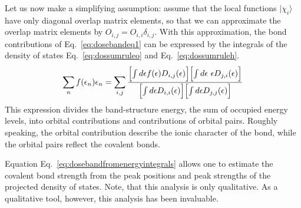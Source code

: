 \documentclass[final,12pt,makeidx,DIV=calc]{article}
\begin{document}
{{{{{{Let us now make a simplifying assumption: assume that the local
functions $|\chi_i\rangle$ have only diagonal overlap matrix elements,
so that we can approximate the overlap matrix elements by
$O_{i,j}=O_{i,i}\delta_{i,j}$.  With this approximation, the bond
contributions of Eq.~\ref{eq:dosebandeq1} can be expressed by the
integrals of the density of states Eq.~\ref{eq:dossumruleo} and
Eq.~\ref{eq:dossumruleh}.
\begin{eqnarray}
\sum_n f(\epsilon_n)\epsilon_n =
\sum_{i,j}\frac{
\Bigl[\int d\epsilon f(\epsilon) D_{i,j}(\epsilon)\Bigr]
\Bigl[\int d\epsilon\ \epsilon  D_{j,i}(\epsilon)\Bigr]
}
{
\Bigl[\int d\epsilon D_{i,i}(\epsilon)\Bigr]
\Bigl[\int d\epsilon  D_{j,j}(\epsilon)\Bigr]
}
\label{eq:dosebandfromenergyintegrals}
\end{eqnarray}
This expression divides the band-structure energy, the sum of occupied
energy levels, into orbital contributions and contributions of orbital
pairs. Roughly speaking, the orbital contribution describe the ionic
character of the bond, while the orbital pairs reflect the covalent
bonds.


Equation Eq.~\ref{eq:dosebandfromenergyintegrals} allows one to
estimate the covalent bond strength from the peak positions and peak
strengths of the projected density of states.  Note, that this
analysis is only qualitative. As a qualitative tool, however, this
analysis has been invaluable.


}}}}}}
\end{document}
